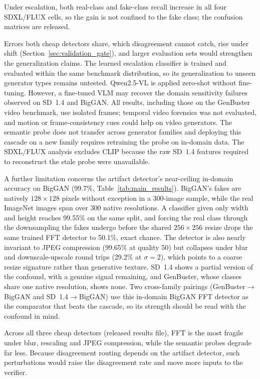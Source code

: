 \documentclass{ieeeaccess}
\begin{document}
Under escalation, both real-class and fake-class recall increase in all four SDXL/FLUX cells, so the gain is not confined to the fake class; the confusion matrices are released.

Errors both cheap detectors share, which disagreement cannot catch, rise under shift (Section~\ref{sec:validation_gate}), and larger evaluation sets would strengthen the generalization claims. The learned escalation classifier is
trained and evaluated within the same benchmark distribution, so its generalization
to unseen generator types remains untested. Qwen2.5-VL is applied zero-shot without
fine-tuning. However, a fine-tuned VLM may recover the domain sensitivity failures observed on
SD~1.4 and BigGAN. All results, including those on the GenBuster video benchmark, use isolated frames; temporal video forensics was not evaluated, and motion or frame-consistency cues could help on video generators. The semantic probe does not transfer across generator
families and deploying this cascade on a new family requires retraining the probe on
in-domain data. The SDXL/FLUX analysis excludes CLIP because the raw SD~1.4 features
required to reconstruct the stale probe were unavailable.

A further limitation concerns the artifact detector's near-ceiling in-domain accuracy on BigGAN (99.7\%, Table~\ref{tab:main_results}). BigGAN's fakes are natively $128{\times}128$ pixels without exception in a 300-image sample, while the real ImageNet images span over 300 native resolutions. A classifier given only width and height reaches 99.55\% on the same split, and forcing the real class through the downsampling the fakes undergo before the shared $256{\times}256$ resize drops the same trained FFT detector to 50.1\%, exact chance. The detector is also nearly invariant to JPEG compression (99.65\% at quality 50) but collapses under blur and downscale-upscale round trips (29.2\% at $\sigma{=}2$), which points to a coarse resize signature rather than generative texture. SD~1.4 shows a partial version of the confound, with a genuine signal remaining, and GenBuster, whose classes share one native resolution, shows none. Two cross-family pairings (GenBuster$\to$BigGAN and SD~1.4$\to$BigGAN) use this in-domain BigGAN FFT detector as the comparator that beats the cascade, so its strength should be read with the confound in mind.

Across all three cheap detectors (released results file), FFT is the most fragile under blur, rescaling and JPEG compression, while the semantic probes degrade far less. Because disagreement routing depends on the artifact detector, such perturbations would raise the disagreement rate and move more inputs to the verifier.
\end{document}
